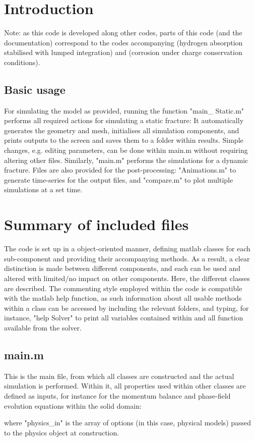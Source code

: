 \documentclass[3p]{elsarticle} %
\let\oldtodo\todo
\renewcommand{\todo}[1]{\oldtodo[inline]{#1}}
\begin{document}
\section{Introduction}

\todo{Intro}

Note: as this code is developed along other codes, parts of this code (and the documentation) correspond to the codes accompanying \citep{Hageman2023a} (hydrogen absorption stabilised with lumped integration) and \citep{Hageman2023b} (corrosion under charge conservation conditions).

\subsection{Basic usage}
For simulating the model as provided, running the function "main\_ Static.m" performs all required actions for simulating a static fracture: It automatically generates the geometry and mesh, initialises all simulation components, and prints outputs to the screen and saves them to a folder within results. Simple changes, e.g. editing parameters, can be done within main.m without requiring altering other files. Similarly, "main.m" performs the simulations for a dynamic fracture. Files are also provided for the post-processing: "Animations.m" to generate time-series for the output files, and "compare.m" to plot multiple simulations at a set time.

\section{Summary of included files}
The code is set up in a object-oriented manner, defining matlab classes for each sub-component and providing their accompanying methods. As a result, a clear distinction is made between different components, and each can be used and altered with limited/no impact on other components. Here, the different classes are described. The commenting style employed within the code is compatible with the matlab help function, as such information about all usable methods within a class can be accessed by including the relevant folders, and typing, for instance, "help Solver" to print all variables contained within and all function available from the solver. 

\subsection{main.m}
This is the main file, from which all classes are constructed and the actual simulation is performed. Within it, all properties used within other classes are defined as inputs, for instance for the momentum balance and phase-field evolution equations within the solid domain:

where "physics{\_}in" is the array of options (in this case, physical models) passed to the physics object at construction. 
\end{document}
